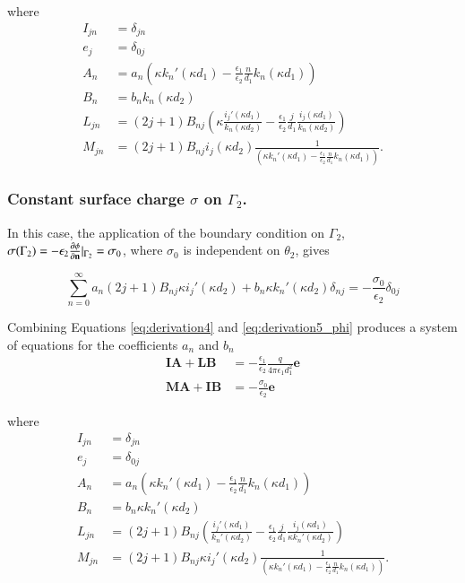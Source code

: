 \noindent where
%
\begin{align} \label{eq:phi_terms}
I_{jn} &= \delta_{jn} \nonumber \\
e_j &= \delta_{0j} \nonumber \\
A_n &= a_n \left(\kappa k_n'(\kappa d_1) - \frac{\epsilon_1}{\epsilon_2} \frac{n}{d_1} k_n(\kappa d_1) \right) \nonumber \\
B_n &= b_n k_n(\kappa d_2) \nonumber \\
L_{jn} &= (2j+1)B_{nj}\left( \kappa \frac{i_j'(\kappa d_1)}{k_n(\kappa d_2)} - \frac{\epsilon_1}{\epsilon_2} \frac{j}{d_1} \frac{i_j(\kappa d_1)}{k_n(\kappa d_2)} \right) \nonumber \\
M_{jn} &= (2j+1)B_{nj} i_j(\kappa d_2) \frac{1}{\left(\kappa k_n'(\kappa d_1) - \frac{\epsilon_1}{\epsilon_2} \frac{n}{d_1} k_n(\kappa d_1) \right)}. 
\end{align}

\subsubsection*{Constant surface charge $\sigma$ on $\Gamma_2$.}
In this case, the application of the boundary condition on $\Gamma_2$, $\sigma(\Gamma_2) = -\epsilon_2 \frac{\partial \phi}{\partial \mathbf{n}} \Large|_{\Gamma_2} = \sigma_0$, where $\sigma_0$ is independent on $\theta_2$, gives

\begin{equation} \label{eq:derivation5_dphi}
\sum_{n=0}^{\infty} a_n(2j+1)B_{nj}\kappa i_j'(\kappa d_2) + b_n \kappa k_n'(\kappa d_2) \delta_{nj} = -\frac{\sigma_0}{\epsilon_2} \delta_{0j}
\end{equation}

\noindent Combining Equations \eqref{eq:derivation4} and  \eqref{eq:derivation5_phi} produces a system of equations for the coefficients $a_n$ and $b_n$
%
\begin{align} \label{eq:system_dphi}
\mathbf{I} \mathbf{A} + \mathbf{L} \mathbf{B} &= -\frac{\epsilon_1}{\epsilon_2} \frac{q}{4\pi\epsilon_1 d_1^2} \mathbf{e} \nonumber \\
\mathbf{M} \mathbf{A} + \mathbf{I} \mathbf{B} &= -\frac{\sigma_0}{\epsilon_2} \mathbf{e}
\end{align}

\noindent where
%
\begin{align} \label{eq:dphi_terms}
I_{jn} &= \delta_{jn} \nonumber \\
e_j &= \delta_{0j} \nonumber \\
A_n &= a_n \left(\kappa k_n'(\kappa d_1) - \frac{\epsilon_1}{\epsilon_2} \frac{n}{d_1} k_n(\kappa d_1) \right) \nonumber \\
B_n &= b_n \kappa k_n'(\kappa d_2) \nonumber \\
L_{jn} &= (2j+1)B_{nj}\left( \frac{i_j'(\kappa d_1)}{k_n'(\kappa d_2)} - \frac{\epsilon_1}{\epsilon_2} \frac{j}{d_1} \frac{i_j(\kappa d_1)}{\kappa k_n'(\kappa d_2)} \right) \nonumber \\
M_{jn} &= (2j+1)B_{nj} \kappa i_j'(\kappa d_2) \frac{1}{\left(\kappa k_n'(\kappa d_1) - \frac{\epsilon_1}{\epsilon_2} \frac{n}{d_1} k_n(\kappa d_1) \right)}. 
\end{align}
 

